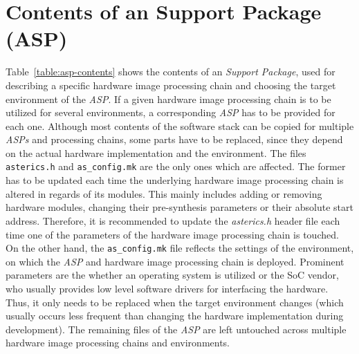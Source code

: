 

\section{Contents of an \asterics Support Package (ASP)}


Table~\ref{table:asp-contents} shows the contents of an \textit{\asterics Support Package}, used for describing a specific hardware image processing chain and choosing the target environment of the \textit{ASP}.
If a given hardware image processing chain is to be utilized for several environments, a corresponding \textit{ASP} has to be provided for each one.
Although most contents of the \asterics software stack can be copied for multiple \textit{ASPs} and processing chains, some parts have to be replaced, since they depend on the actual hardware implementation and the environment.
The files \texttt{asterics.h} and \texttt{as\_config.mk} are the only ones which are affected.
The former has to be updated each time the underlying hardware image processing chain is altered in regards of its modules.
This mainly includes adding or removing hardware modules, changing their pre-synthesis parameters or their absolute start address.
Therefore, it is recommended to update the \textit{asterics.h} header file each time one of the parameters of the hardware image processing chain is touched.
On the other hand, the \texttt{as\_config.mk} file reflects the settings of the environment, on which the \textit{ASP} and hardware image processing chain is deployed.
Prominent parameters are the whether an operating system is utilized or the SoC vendor, who usually provides low level software drivers for interfacing the hardware.
Thus, it only needs to be replaced when the target environment changes (which usually occurs less frequent than changing the hardware implementation during development).
The remaining files of the \textit{ASP} are left untouched across multiple hardware image processing chains and environments.



